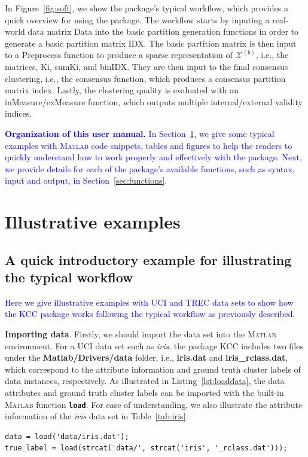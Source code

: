 \documentclass[10pt]{acmtrans2e}
\newcommand{\Matlab}{\textsc{Matlab}}
\newcommand{\package}[1]{\textsf{#1}\xspace} %
\newcommand{\function}[1]{\textbf{\texttt{#1}}}
\begin{document}
In Figure~\ref{fig:soft}, we show the package's typical workflow, which provides a quick overview for using the package. The workflow starts by inputing a real-world data matrix \textsf{Data} into the basic partition generation functions in order to generate a basic partition matrix \textsf{IDX}. The basic partition matrix is then input to a \textsf{Preprocess} function to produce a sparse representation of $\mathcal{X}^{(b)}$, i.e., the matrices, \textsf{Ki}, \textsf{sumKi}, and \textsf{binIDX}. They are then input to the final consensus clustering, i.e., the consensus function, which produces a consensus partition matrix \textsf{index}. Lastly, the clustering quality is evaluated with an \textsf{inMeasure}/\textsf{exMeasure} function, which outputs multiple internal/external validity indices.

\textcolor{blue}{\textbf{Organization of this user manual.} In Section~\ref{sec:examples}, we give some typical examples with \Matlab{} code snippets, tables and figures to help the readers to quickly understand how to work properly and effectively with the package. Next, we provide details for each of the package's available functions, such as syntax, input and output, in Section~\ref{sec:functions}.}

\section{Illustrative examples}\label{sec:examples}
\subsection{A quick introductory example for illustrating the typical workflow} \label{subsec:illexam}
\textcolor{blue}{Here we give illustrative examples with UCI and TREC data sets to show how the \package{KCC} package works following the typical workflow as previously described.}

\textbf{Importing data}. Firstly, we should import the data set into the \Matlab{} environment. For a UCI data set such as \textit{iris}, the package \package{KCC} includes two files under the \textbf{Matlab/Drivers/data} folder, i.e., \textbf{iris.dat} and \textbf{iris\_rclass.dat}, which correspond to the attribute information and ground truth cluster labels of data instances, respectively. As illustrated in Listing~\ref{lst:loaddata}, the data attributes and ground truth cluster labels can be imported with the built-in \Matlab{} function \function{load}. For ease of understanding, we also illustrate the attribute information of the \textit{iris} data set in Table~\ref{tab:iris}.
\begin{lstlisting}[caption={Using \function{load} to import data attributes and ground truth cluster labels.},label=lst:loaddata]
data = load('data/iris.dat');
true_label = load(strcat('data/', strcat('iris', '_rclass.dat')));
\end{lstlisting}
\end{document}
